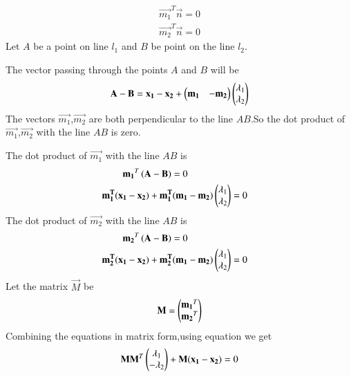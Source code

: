 \documentclass[journal,12pt,twocolumn]{IEEEtran}
\begin{document}
\begin{align}
 \vec{m_1}^T  \vec{n} = 0   
\end{align}
\begin{align}
\vec{m_2}^T\vec{n} = 0    
\end{align}
Let $A$ be a point on line $l_1$ and $B$ be point on the line $l_2$.\par
The vector passing through the points $A$ and $B$ will be
\begin{align}
	\mathbf{A-B}=\mathbf{x_1-x_2}+\begin{pmatrix}\mathbf{m_1} & -\mathbf{m_2}\end{pmatrix}\begin{pmatrix}\lambda_1\\\lambda_2\end{pmatrix}
\end{align}
The vectors $\vec{m_1}$,$\vec{m_2}$ are both perpendicular to the line ${AB}$.So the dot product of $\vec{m_1}$,$\vec{m_2}$ with the line ${AB}$ is zero.\par
The dot product of $\vec{m_1}$ with the line ${AB}$ is
\begin{align}
	\mathbf{m_1}^T\left(\mathbf{A-B}\right)=0\label{eq:32}\\
	\mathbf{m_1^T}(\mathbf{x_1-x_2})+\mathbf{m_1^T}(\mathbf{m_1} & -\mathbf{m_2})\begin{pmatrix}\lambda_1 \\ \lambda_2\end{pmatrix}=0
\end{align}
The dot product of $\vec{m_2}$ with the line ${AB}$ is
\begin{align}
	\mathbf{m_2}^T\left(\mathbf{A-B}\right)=0\label{eq:34}\\
	\mathbf{m_2^T}(\mathbf{x_1-x_2})+\mathbf{m_2^T}(\mathbf{m_1} & -\mathbf{m_2})\begin{pmatrix}\lambda_1 \\ \lambda_2\end{pmatrix}=0
\end{align}
Let the matrix $\vec{M}$ be
\begin{align}
	\mathbf{M}=\begin{pmatrix}\mathbf{m_1}^T\\\mathbf{m_2}^T\end{pmatrix}
\end{align}
Combining the equations in matrix form,using equation we get
\begin{align}
	\mathbf{M}\mathbf{M}^T\begin{pmatrix}\lambda_1\\-\lambda_2\end{pmatrix}+\mathbf{M}\mathbf{(x_1-x_2)}=0
\end{align}
\end{document}
